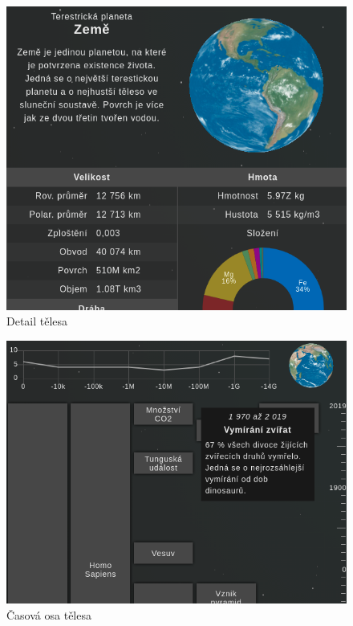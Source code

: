\documentclass[a4paper,12pt]{article}
\begin{document}
\begin{figure}[H]
\begin{center}
\includegraphics[width=350pt]{Images/Body.png}
\caption{Detail tělesa}
\label{BodiesList}
\end{center}
\end{figure}

\begin{figure}[H]
\begin{center}
\includegraphics[width=350pt]{Images/Timeline.png}
\caption{Časová osa tělesa}
\label{BodiesList}
\end{center}
\end{figure}
\end{document}
